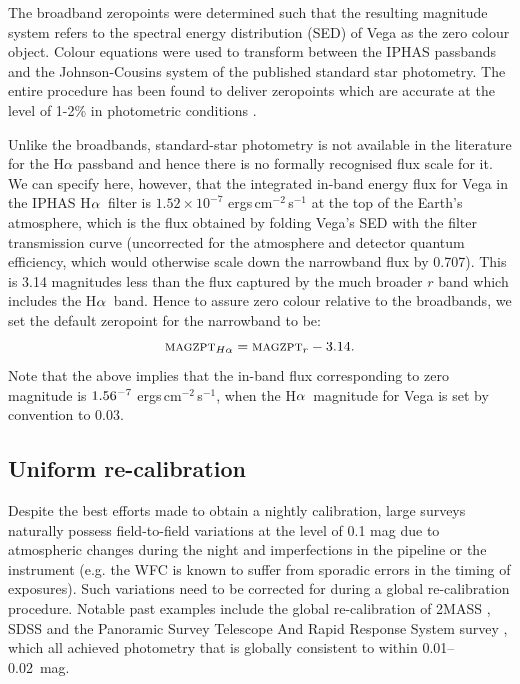 \documentclass[useAMS,usenatbib]{mn2e}
\def\ha{\mbox{H$\rm \alpha$}}
\begin{document}
The broadband zeropoints were determined such that the resulting magnitude system
refers to the spectral energy distribution (SED) of Vega 
as the zero colour object. 
Colour equations were used to transform between the IPHAS passbands 
and the Johnson-Cousins system 
of the published standard star photometry.
The entire procedure has been found to deliver zeropoints which 
are accurate at the level of 1-2\% 
in photometric conditions \citep{Gonzalez-Solares2011}.

Unlike the broadbands, 
standard-star photometry is not available in the literature 
for the H$\alpha$ passband
and hence there is no formally recognised flux scale 
for it.
We can specify here, however, 
that the integrated in-band energy flux for Vega 
in the IPHAS \ha\ filter 
is $1.52 \times 10^{-7}$ ergs\,cm$^{-2}$\,s$^{-1}$ 
at the top of the Earth's atmosphere,
which is the flux obtained by folding 
Vega's SED with the filter transmission curve 
(uncorrected for the atmosphere and detector quantum efficiency,
which would otherwise scale down the narrowband flux by 0.707).
This is 3.14 magnitudes less than the flux captured 
by the much broader $r$ band
which includes the \ha\ band.
Hence to assure zero colour relative to the broadbands,
we set the default zeropoint for the narrowband to be:
\begin{equation}
\textsc{magzpt}_{H\alpha} = \textsc{magzpt}_r - 3.14.
\label{eqn:zpha}
\end{equation}
Note that the above implies that the in-band flux corresponding to
zero magnitude is $1.56 \time 10^{-7}$ ergs\,cm$^{-2}$\,s$^{-1}$,
when the \ha\ magnitude for Vega is set by convention to 0.03.


\subsection{Uniform re-calibration}

Despite the best efforts made to obtain a nightly calibration,
large surveys naturally possess field-to-field variations
at the level of 0.1 mag
due to atmospheric changes during the night
and imperfections in the pipeline or the instrument
(e.g. the WFC is known to suffer from sporadic errors
in the timing of exposures).
Such variations need to be corrected for 
during a global re-calibration procedure.
Notable past examples include the global re-calibration 
of 2MASS \citep[][]{Nikolaev2000},
SDSS \citep[][]{Padmanabhan2008}
and the Panoramic Survey Telescope 
And Rapid Response System survey \citep[Pan-STARRS;][]{Schlafly2012},
which all achieved photometry 
that is globally consistent to within 0.01--0.02~mag.
\end{document}
